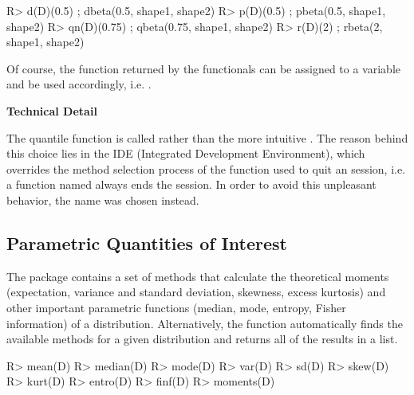 \documentclass[nojss]{jss}
\newcommand{\fct}[1]{\code{#1()}}
\begin{document}
\begin{CodeChunk}
\begin{CodeInput}
R> d(D)(0.5) ; dbeta(0.5, shape1, shape2)
R> p(D)(0.5) ; pbeta(0.5, shape1, shape2)
R> qn(D)(0.75) ; qbeta(0.75, shape1, shape2)
R> r(D)(2) ; rbeta(2, shape1, shape2)
\end{CodeInput}
\end{CodeChunk}

Of course, the function returned by the functionals can be assigned to a variable and be used accordingly, i.e. .

\begin{leftbar}
\textbf{Technical Detail}

The quantile function is called \fct{qn} rather than the more intuitive \fct{q}. The reason behind this choice lies in the  IDE (Integrated Development Environment), which overrides the method selection process of the  function \fct{q} used to quit an  session, i.e. a function named \fct{q} always ends the session. In order to avoid this unpleasant behavior, the name \fct{qn} was chosen instead.
\end{leftbar}

\subsection[Parametric Quantities of Interest]{Parametric Quantities of Interest} \label{ss:moments}

The  package contains a set of methods that calculate the theoretical moments (expectation, variance and standard deviation, skewness, excess kurtosis) and other important parametric functions (median, mode, entropy, Fisher information) of a distribution. Alternatively, the \fct{moments} function automatically finds the available methods for a given distribution and returns all of the results in a list.

\begin{CodeChunk}
\begin{CodeInput}
R> mean(D)
R> median(D)
R> mode(D)
R> var(D)
R> sd(D)
R> skew(D)
R> kurt(D)
R> entro(D)
R> finf(D)
R> moments(D)
\end{CodeInput}
\end{CodeChunk}
\end{document}
